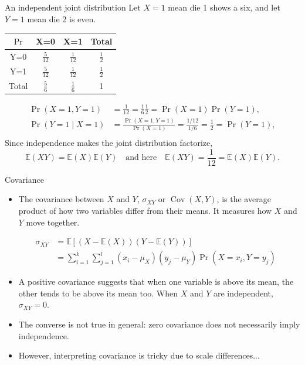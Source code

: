 \documentclass[notes,10pt, aspectratio=169]{beamer}
\begin{document}
\begin{frame}{An independent joint distribution}
\small
Let $X=1$ mean die 1 shows a six, and let $Y=1$ mean die 2 is even.
\begin{center}
\begin{tabular}{|c|c|c|c|}
\hline
$\Pr$    & X=0 & X=1 & Total \\ \hline
Y=0   & $\frac{5}{12}$ & $\frac{1}{12}$ & $\frac{1}{2}$ \\ \hline
Y=1   & $\frac{5}{12}$ & $\frac{1}{12}$ & $\frac{1}{2}$ \\ \hline
Total & $\frac{5}{6}$  & $\frac{1}{6}$  & 1 \\ \hline
\end{tabular}
\end{center}
\vspace{.15cm}
\begin{align*}
\Pr(X=1,Y=1)&=\frac{1}{12}
           =\frac{1}{6}\frac{1}{2}=\Pr(X=1)\Pr(Y=1),\\
\Pr(Y=1\mid X=1)&=\frac{\Pr(X=1,Y=1)}{\Pr(X=1)}
               =\frac{1/12}{1/6}=\frac{1}{2}=\Pr(Y=1),\\
\end{align*}
Since independence makes the joint distribution factorize,
\[
\mathbb{E}(XY)=\mathbb{E}(X)\mathbb{E}(Y)
\quad\text{and here}\quad
\mathbb{E}(XY)=\frac{1}{12}=\mathbb{E}(X)\mathbb{E}(Y).
\]
\end{frame}

\begin{frame}{Covariance}
    \begin{itemize}
        \item The covariance between $X$ and $Y$, $\sigma_{XY}$ or $\operatorname{Cov}(X,Y)$, is the average product of how two variables differ from their means. It measures how $X$ and $Y$ move together.
    \end{itemize}
\begin{eqnarray*}
    &\sigma_{XY} &= \mathbb{E}[(X-\mathbb{E}(X))(Y-\mathbb{E}(Y))]\\
    &  &=\sum^k_{i=1}\sum^l_{j=1} (x_i-\mu_X)(y_j-\mu_Y)\Pr(X=x_i, Y=y_j)
\end{eqnarray*} 
 \begin{itemize}
     \item A positive covariance suggests that when one variable is above its mean, the other tends to be above its mean too. When $X$ and $Y$ are independent, $\sigma_{XY}=0$.\vspace{.2cm}
    \item The converse is not true in general: zero covariance does not necessarily imply independence.\vspace{.2cm}
    \item However, interpreting covariance is tricky due to scale differences... 
 \end{itemize}       
\end{frame}
\end{document}
